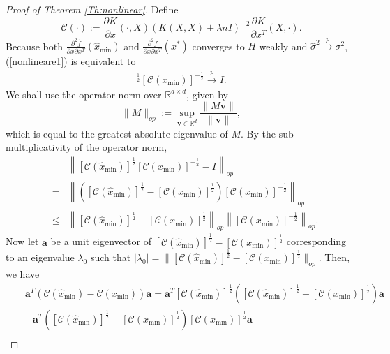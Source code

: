 \documentclass[12pt]{article}
\theoremstyle{plain}
\theoremstyle{remark}
\begin{document}
\begin{proof}[Proof of Theorem \ref{Th:nonlinear}]
 Define 
    \[\mathscr{C}(\cdot):=\frac{\partial K}{\partial x}(\cdot,X)(K(X,X)+\lambda n I)^{-2}\frac{\partial K}{\partial x^T}(X,\cdot).\]
    Because both $\frac{\partial^2\hat{f}}{\partial x\partial x^T}(\hat{x}_{\min})$ and $\frac{\partial^2\hat{f}}{\partial x\partial x^T}(x^*)$ converges to $H$ weakly and $\hat{\sigma}^2\xrightarrow{p}\sigma^2$, (\ref{nonlineare1}) is equivalent to
    \begin{eqnarray}
        [\mathscr{C}(\hat{x}_{\min})]^{\frac{1}{2}}[\mathscr{C}(x_{\min})]^{-\frac{1}{2}}\xrightarrow{p} I.
    \end{eqnarray}
    We shall use the operator norm over $\mathbb{R}^{d\times d}$, given by
    \[\|M\|_{op}:=\sup_{\mathbf{v}\in\mathbb{R}^d}\frac{\|M\mathbf{v}\|}{\|\mathbf{v}\|},\]
    which is equal to the greatest absolute eigenvalue of $M$. By the sub-multiplicativity of the operator norm,
    \begin{eqnarray*}
        &&\left\|[\mathscr{C}(\hat{x}_{\min})]^{\frac{1}{2}}[\mathscr{C}(x_{\min})]^{-\frac{1}{2}}-I\right\|_{op}\\
        &=&\left\|\left([\mathscr{C}(\hat{x}_{\min})]^{\frac{1}{2}}-[\mathscr{C}(x_{\min})]^{\frac{1}{2}}\right)[\mathscr{C}(x_{\min})]^{-\frac{1}{2}}\right\|_{op}\\
        &\leq&\left\|[\mathscr{C}(\hat{x}_{\min})]^{\frac{1}{2}}-[\mathscr{C}(x_{\min})]^{\frac{1}{2}}\right\|_{op}\left\|[\mathscr{C}(x_{\min})]^{-\frac{1}{2}}\right\|_{op}.
    \end{eqnarray*}
    Now let $\mathbf{a}$ be a unit eigenvector of $[\mathscr{C}(\hat{x}_{\min})]^{\frac{1}{2}}-[\mathscr{C}(x_{\min})]^{\frac{1}{2}}$ corresponding to an eigenvalue $\lambda_0$ such that $|\lambda_0|=\|[\mathscr{C}(\hat{x}_{\min})]^{\frac{1}{2}}-[\mathscr{C}(x_{\min})]^{\frac{1}{2}}\|_{op}$. Then, we have
    \begin{eqnarray*}
        &&\mathbf{a}^T\left(\mathscr{C}(\hat{x}_{\min})-\mathscr{C}(x_{\min})\right)\mathbf{a}
        =\mathbf{a}^T[\mathscr{C}(\hat{x}_{\min})]^{\frac{1}{2}}\left([\mathscr{C}(\hat{x}_{\min})]^{\frac{1}{2}}-[\mathscr{C}(x_{\min})]^{\frac{1}{2}}\right)\mathbf{a}\\&&+\mathbf{a}^T\left([\mathscr{C}(\hat{x}_{\min})]^{\frac{1}{2}}-[\mathscr{C}(x_{\min})]^{\frac{1}{2}}\right)[\mathscr{C}(x_{\min})]^{\frac{1}{2}}\mathbf{a}\\

\end{eqnarray*}
\end{proof}
\end{document}
